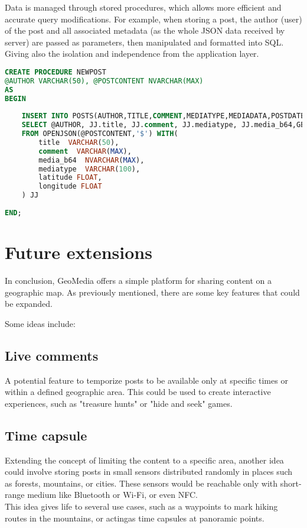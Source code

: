 \documentclass[conference]{IEEEtran}
\begin{document}
Data is managed through stored procedures, which allows more efficient and accurate query modifications. For example, when storing a post,
the author (user) of the post and all associated metadata (as the whole JSON data received by server) are passed as parameters, then manipulated and formatted into SQL. Giving also the isolation and independence from the application layer.

\begin{lstlisting}[language=SQL, description=Stored Procedure of post creation]
CREATE PROCEDURE NEWPOST
@AUTHOR VARCHAR(50), @POSTCONTENT NVARCHAR(MAX)
AS
BEGIN
	
	INSERT INTO POSTS(AUTHOR,TITLE,COMMENT,MEDIATYPE,MEDIADATA,POSTDATETIME, LATITUDE, LONGITUDE)
	SELECT @AUTHOR, JJ.title, JJ.comment, JJ.mediatype, JJ.media_b64,GETDATE(), JJ.latitude ,JJ.longitude 
	FROM OPENJSON(@POSTCONTENT,'$') WITH(
		title  VARCHAR(50),
		comment  VARCHAR(MAX),
		media_b64  NVARCHAR(MAX),
		mediatype  VARCHAR(100),
		latitude FLOAT,
		longitude FLOAT
	) JJ
	
END;

\end{lstlisting}


\section{Future extensions}

In conclusion, GeoMedia offers a simple platform for sharing content on a geographic map. As previously mentioned, there are some key features that could be expanded.

Some ideas include:

\subsection{Live comments}
A potential feature to temporize posts to be available only at specific times or within a defined geographic area.
This could be used to create interactive experiences, such as "treasure hunts" or "hide and seek" games.

\subsection{Time capsule}

Extending the concept of limiting the content to a specific area, another idea could involve storing posts in small sensors distributed randomly in places such as forests, mountains, or cities. 
These sensors would be reachable only with short-range medium like Bluetooth or Wi-Fi, or even NFC.
\\
This idea gives life to several use cases, such as a waypoints to mark hiking routes in the mountains, or actingas time capsules at panoramic points.
\end{document}
